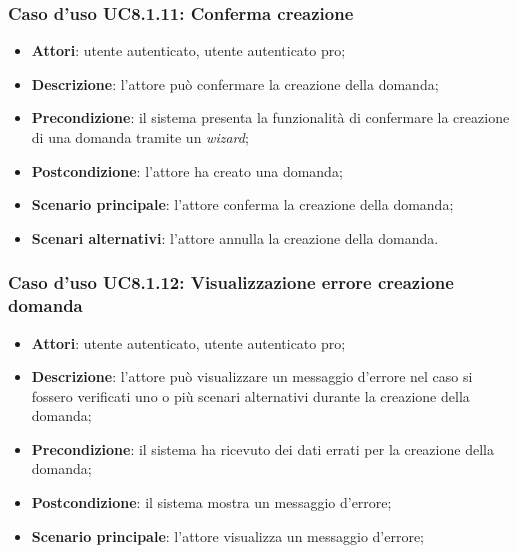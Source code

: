 








	\subsubsection{Caso d'uso UC8.1.11: Conferma creazione}
	\begin{itemize}
		\item
			\textbf{Attori}: utente autenticato, utente autenticato pro;
		\item
			\textbf{Descrizione}: l'attore può confermare la creazione della domanda;
		\item		
			\textbf{Precondizione}: il sistema presenta la funzionalità di confermare la creazione di una domanda tramite un \textit{wizard};
		\item
			\textbf{Postcondizione}: l'attore ha creato una domanda;
		\item
			\textbf{Scenario principale}: l'attore conferma la creazione della domanda;		
		\item
	 		\textbf{Scenari alternativi}: l'attore annulla la creazione della domanda.
					
	\end{itemize}	
	
	\subsubsection{Caso d'uso UC8.1.12: Visualizzazione errore creazione domanda}
	\begin{itemize}
		\item
			\textbf{Attori}: utente autenticato, utente autenticato pro;
		\item
			\textbf{Descrizione}: l'attore può visualizzare un messaggio d'errore nel caso si fossero verificati uno o più scenari alternativi durante la creazione della domanda;
		\item		
			\textbf{Precondizione}: il sistema ha ricevuto dei dati errati per la creazione della domanda;
		\item
			\textbf{Postcondizione}: il sistema mostra un messaggio d'errore;
		\item
			\textbf{Scenario principale}: l'attore visualizza un messaggio d'errore;	
	\end{itemize}	


